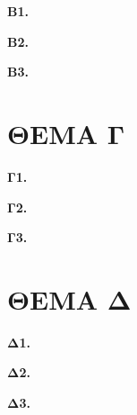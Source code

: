 \documentclass[12pt]{article}
\begin{document}
\textbf{Β1.}

\vspace{1cm}

\textbf{Β2.}

\vspace{1cm}

\textbf{Β3.}

\newpage

\section*{ΘΕΜΑ Γ}

\textbf{Γ1.}

\vspace{1cm}

\textbf{Γ2.}

\vspace{1cm}

\textbf{Γ3.}

\vspace{1cm}

\section*{ΘΕΜΑ Δ}

\textbf{Δ1.}

\vspace{1cm}

\textbf{Δ2.}

\vspace{1cm}

\textbf{Δ3.}
\end{document}
